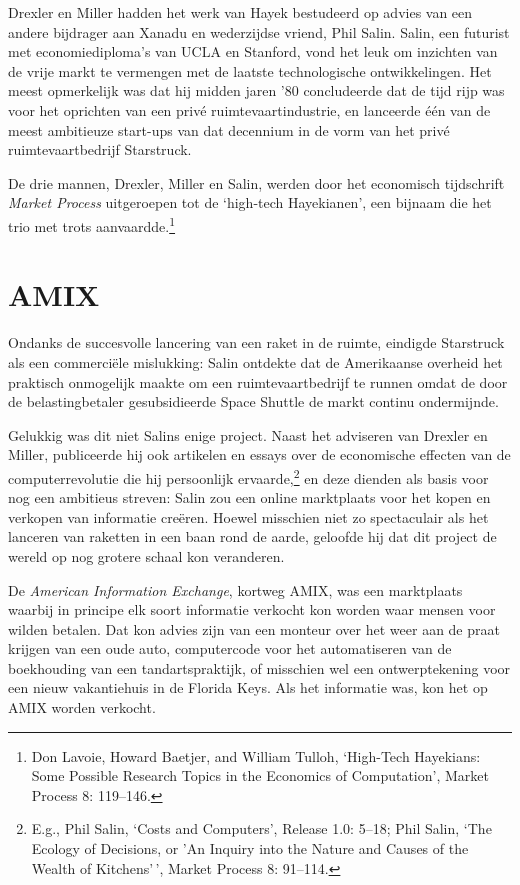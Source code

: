 \documentclass[smalldemyvopaper,11pt,twoside,onecolumn,openright,extrafontsizes,hidelinks]{memoir}
\begin{document}
Drexler en Miller hadden het werk van Hayek bestudeerd op advies van een
andere bijdrager aan Xanadu en wederzijdse vriend, Phil Salin. Salin,
een futurist met economiediploma's van UCLA en Stanford, vond het leuk
om inzichten van de vrije markt te vermengen met de laatste
technologische ontwikkelingen. Het meest opmerkelijk was dat hij midden
jaren '80 concludeerde dat de tijd rijp was voor het oprichten van een
privé ruimtevaartindustrie, en lanceerde één van de meest ambitieuze
start-ups van dat decennium in de vorm van het privé ruimtevaartbedrijf
Starstruck.

De drie mannen, Drexler, Miller en Salin, werden door het economisch
tijdschrift \emph{Market Process} uitgeroepen tot de `high-tech
Hayekianen', een bijnaam die het trio met trots aanvaardde.\footnote{Don
  Lavoie, Howard Baetjer, and William Tulloh, `High-Tech Hayekians: Some
  Possible Research Topics in the Economics of Computation', Market
  Process 8: 119--146.}

\section{AMIX}\label{amix}

Ondanks de succesvolle lancering van een raket in de ruimte, eindigde
Starstruck als een commerciële mislukking: Salin ontdekte dat de
Amerikaanse overheid het praktisch onmogelijk maakte om een
ruimtevaartbedrijf te runnen omdat de door de belastingbetaler
gesubsidieerde Space Shuttle de markt continu ondermijnde.

Gelukkig was dit niet Salins enige project. Naast het adviseren van
Drexler en Miller, publiceerde hij ook artikelen en essays over de
economische effecten van de computerrevolutie die hij persoonlijk
ervaarde,\footnote{E.g., Phil Salin, `Costs and Computers', Release 1.0:
  5--18; Phil Salin, `The Ecology of Decisions, or 'An Inquiry into the
  Nature and Causes of the Wealth of Kitchens'\,', Market Process 8:
  91--114.} en deze dienden als basis voor nog een ambitieus streven:
Salin zou een online marktplaats voor het kopen en verkopen van
informatie creëren. Hoewel misschien niet zo spectaculair als het
lanceren van raketten in een baan rond de aarde, geloofde hij dat dit
project de wereld op nog grotere schaal kon veranderen.

De \emph{American Information Exchange}, kortweg AMIX, was een
marktplaats waarbij in principe elk soort informatie verkocht kon worden
waar mensen voor wilden betalen. Dat kon advies zijn van een monteur
over het weer aan de praat krijgen van een oude auto, computercode voor
het automatiseren van de boekhouding van een tandartspraktijk, of
misschien wel een ontwerptekening voor een nieuw vakantiehuis in de
Florida Keys. Als het informatie was, kon het op AMIX worden verkocht.
\end{document}
